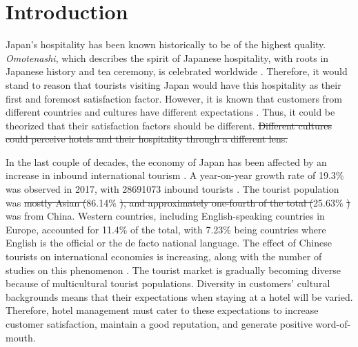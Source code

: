 \documentclass[smallextended,natbib]{svjour3}       %
\providecommand{\DIFadd}[1]{{\protect\color{blue}\uwave{#1}}} %
\providecommand{\DIFdel}[1]{{\protect\color{red}\sout{#1}}}                      %
\providecommand{\DIFaddbegin}{} %
\providecommand{\DIFaddend}{} %
\providecommand{\DIFdelbegin}{} %
\providecommand{\DIFdelend}{} %
\newcommand{\DIFscaledelfig}{0.5}
\newlength{\DIFdelgraphicswidth} %
\newlength{\DIFdelgraphicsheight} %
\newcommand{\DIFaddincludegraphics}[2][]{{\color{blue}\fbox{\DIFOincludegraphics[#1]{#2}}}} %
\newcommand{\DIFdelincludegraphics}[2][]{%
\sbox{\DIFdelgraphicsbox}{\DIFOincludegraphics[#1]{#2}}%
\settoboxwidth{\DIFdelgraphicswidth}{\DIFdelgraphicsbox} %
\settoboxtotalheight{\DIFdelgraphicsheight}{\DIFdelgraphicsbox} %
\scalebox{\DIFscaledelfig}{%
\parbox[b]{\DIFdelgraphicswidth}{\usebox{\DIFdelgraphicsbox}\\[-\baselineskip] \rule{\DIFdelgraphicswidth}{0em}}\llap{\resizebox{\DIFdelgraphicswidth}{\DIFdelgraphicsheight}{%
\setlength{\unitlength}{\DIFdelgraphicswidth}%
\begin{picture}(1,1)%
\thicklines\linethickness{2pt} %
{\color[rgb]{1,0,0}\put(0,0){\framebox(1,1){}}}%
{\color[rgb]{1,0,0}\put(0,0){\line( 1,1){1}}}%
{\color[rgb]{1,0,0}\put(0,1){\line(1,-1){1}}}%
\end{picture}%
}\hspace*{3pt}}} %
} %
\DeclareRobustCommand{\DIFaddbegin}{\DIFOaddbegin \let\includegraphics\DIFaddincludegraphics} %
\DeclareRobustCommand{\DIFaddend}{\DIFOaddend \let\includegraphics\DIFOincludegraphics} %
\DeclareRobustCommand{\DIFdelbegin}{\DIFOdelbegin \let\includegraphics\DIFdelincludegraphics} %
\DeclareRobustCommand{\DIFdelend}{\DIFOaddend \let\includegraphics\DIFOincludegraphics} %
\begin{document}
\linenumbers

\section{Introduction}\label{intro}

  Japan’s hospitality has been known historically to be of the highest quality. \textit{Omotenashi}, which describes the spirit of Japanese hospitality, with roots in Japanese history and tea ceremony, is celebrated worldwide \cite[][]{al2015characteristics}. Therefore, it would stand to reason that tourists visiting Japan would have this hospitality as their first and foremost satisfaction factor. However, it is known that customers from different countries and cultures have different expectations \cite[][]{engel1990}. Thus, it could be theorized that their satisfaction factors should be different. 
\DIFdelbegin \DIFdel{Different cultures could perceive hotels and their hospitality through a different lens.
}\DIFdelend 

  In the last couple of decades, the economy of Japan has been affected by an increase in inbound international tourism \cite[][]{jones2009}. A year-on-year growth rate of 19.3\% was observed in 2017, with \num[group-separator={,}]{28691073} inbound tourists \cite[][]{jnto2003-2019}. The tourist population was \DIFdelbegin \DIFdel{mostly Asian (}\DIFdelend 86.14\% \DIFdelbegin \DIFdel{), and approximately one-fourth of the total (}\DIFdelend \DIFaddbegin \DIFadd{Asian, and }\DIFaddend 25.63\% \DIFdelbegin \DIFdel{) }\DIFdelend was from China. Western countries, including English-speaking countries in Europe, accounted for 11.4\% of the total, with 7.23\% being countries where English is the official or the de facto national language. The effect of Chinese tourists on international economies is increasing, along with the number of studies on this phenomenon \cite[][]{sun2017}. The tourist market is gradually becoming diverse because of multicultural tourist populations. Diversity in customers' cultural backgrounds means that their expectations when staying at a hotel will be varied. Therefore, hotel management must cater to these expectations to increase customer satisfaction, maintain a good reputation, and generate positive word-of-mouth.
\end{document}
